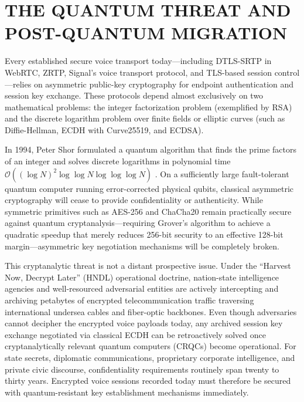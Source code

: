 \section{THE QUANTUM THREAT AND POST-QUANTUM MIGRATION}
Every established secure voice transport today—including DTLS-SRTP in WebRTC, ZRTP, Signal's voice transport protocol, and TLS-based session control—relies on asymmetric public-key cryptography for endpoint authentication and session key exchange. These protocols depend almost exclusively on two mathematical problems: the integer factorization problem (exemplified by RSA) and the discrete logarithm problem over finite fields or elliptic curves (such as Diffie-Hellman, ECDH with Curve25519, and ECDSA).

In 1994, Peter Shor formulated a quantum algorithm that finds the prime factors of an integer and solves discrete logarithms in polynomial time $\mathcal{O}((\log N)^2 \log \log N \log \log \log N)$ \cite{shor1994algorithms}. On a sufficiently large fault-tolerant quantum computer running error-corrected physical qubits, classical asymmetric cryptography will cease to provide confidentiality or authenticity. While symmetric primitives such as AES-256 and ChaCha20 remain practically secure against quantum cryptanalysis—requiring Grover's algorithm to achieve a quadratic speedup that merely reduces 256-bit security to an effective 128-bit margin—asymmetric key negotiation mechanisms will be completely broken.

This cryptanalytic threat is not a distant prospective issue. Under the ``Harvest Now, Decrypt Later'' (HNDL) operational doctrine, nation-state intelligence agencies and well-resourced adversarial entities are actively intercepting and archiving petabytes of encrypted telecommunication traffic traversing international undersea cables and fiber-optic backbones. Even though adversaries cannot decipher the encrypted voice payloads today, any archived session key exchange negotiated via classical ECDH can be retroactively solved once cryptanalytically relevant quantum computers (CRQCs) become operational. For state secrets, diplomatic communications, proprietary corporate intelligence, and private civic discourse, confidentiality requirements routinely span twenty to thirty years. Encrypted voice sessions recorded today must therefore be secured with quantum-resistant key establishment mechanisms immediately.

